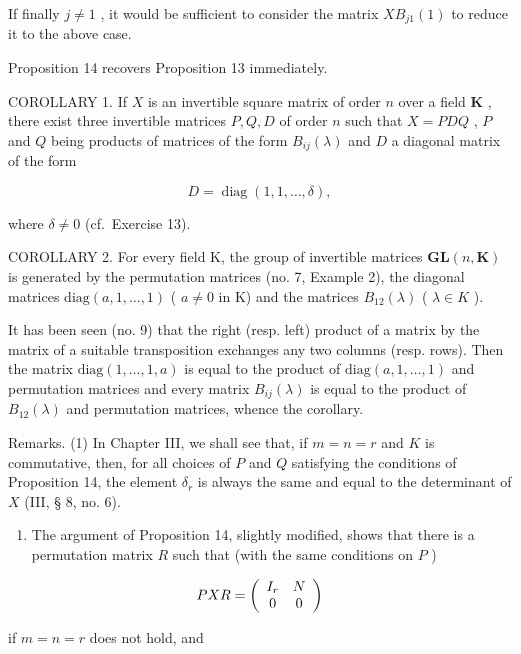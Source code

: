 If finally \(j \neq 1\) , it would be sufficient to consider the matrix \(XB_{j1}(1)\) to reduce it to the above case.

Proposition 14 recovers Proposition 13 immediately.

COROLLARY 1. If \(X\) is an invertible square matrix of order \(n\) over a field \(\mathbf{K}\) , there exist three invertible matrices \(P, Q, D\) of order \(n\) such that \(X = PDQ\) , \(P\) and \(Q\) being products of matrices of the form \(B_{ij}(\lambda)\) and \(D\) a diagonal matrix of the form

\[
D = \operatorname{diag} (1, 1, \dots , \delta),
\]

where \(\delta \neq 0\) (cf.~Exercise 13).

COROLLARY 2. For every field K, the group of invertible matrices \(\mathbf{GL}(n,\mathbf{K})\) is generated by the permutation matrices (no. 7, Example 2), the diagonal matrices \(\text{diag}(a,1,\ldots,1)\) ( \(a\neq0\) in K) and the matrices \(B_{12}(\lambda)\) ( \(\lambda\in K\) ).

It has been seen (no. 9) that the right (resp. left) product of a matrix by the matrix of a suitable transposition exchanges any two columns (resp. rows). Then the matrix \(\text{diag}(1, \ldots, 1, a)\) is equal to the product of \(\text{diag}(a, 1, \ldots, 1)\) and permutation matrices and every matrix \(B_{ij}(\lambda)\) is equal to the product of \(B_{12}(\lambda)\) and permutation matrices, whence the corollary.

Remarks. (1) In Chapter III, we shall see that, if \(m = n = r\) and \(K\) is commutative, then, for all choices of \(P\) and \(Q\) satisfying the conditions of Proposition 14, the element \(\delta_r\) is always the same and equal to the determinant of \(X\) (III, § 8, no. 6).

\begin{enumerate}
\def\labelenumi{(\arabic{enumi})}
\setcounter{enumi}{1}
\tightlist
\item
  The argument of Proposition 14, slightly modified, shows that there is a permutation matrix \(R\) such that (with the same conditions on \(P\) )
\end{enumerate}

\[
P X R = \left( \begin{array}{c c} I _ {r} & N \\ 0 & 0 \end{array} \right)
\]

if \(m = n = r\) does not hold, and

